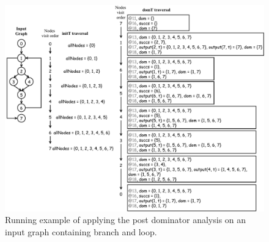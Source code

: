\begin{figure}[ht!]
\centering
\includegraphics[width=0.9\linewidth]{figures/running-example.pdf}
\caption{Running example of applying the post dominator analysis on an input
graph containing branch and loop.}
\label{fig:running-example}
\end{figure}


